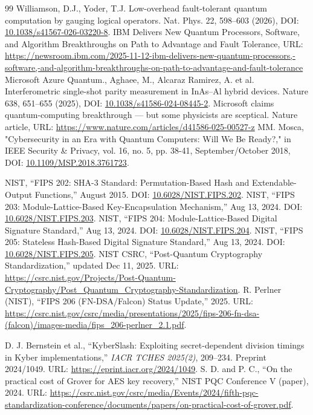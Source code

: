 \documentclass[11pt,a4paper]{article}
\begin{document}
\begin{thebibliography}{99}
 Williamson, D.J., Yoder, T.J. Low-overhead fault-tolerant quantum computation by gauging logical operators. Nat. Phys. 22, 598–603 (2026), DOI: \href{https://doi.org/10.1038/s41567-026-03220-8}{10.1038/s41567-026-03220-8}.
 IBM Delivers New Quantum Processors, Software, and Algorithm Breakthroughs on Path to Advantage and Fault Tolerance, URL: \url{https://newsroom.ibm.com/2025-11-12-ibm-delivers-new-quantum-processors,-software,-and-algorithm-breakthroughs-on-path-to-advantage-and-fault-tolerance}
 Microsoft Azure Quantum., Aghaee, M., Alcaraz Ramirez, A. et al. Interferometric single-shot parity measurement in InAs–Al hybrid devices. Nature 638, 651–655 (2025), DOI: \href{https://doi.org/10.1038/s41586-024-08445-2}{10.1038/s41586-024-08445-2}.
 Microsoft claims quantum-computing breakthrough — but some physicists are sceptical. Nature article, URL: \url{https://www.nature.com/articles/d41586-025-00527-z}
 MM. Mosca, "Cybersecurity in an Era with Quantum Computers: Will We Be Ready?," in IEEE Security \& Privacy, vol. 16, no. 5, pp. 38-41, September/October 2018, DOI: \href{https://doi.org/10.1109/MSP.2018.3761723}{10.1109/MSP.2018.3761723}.

 NIST, ``FIPS 202: SHA-3 Standard: Permutation-Based Hash and Extendable-Output Functions,'' August 2015. DOI: \href{https://doi.org/10.6028/NIST.FIPS.202}{10.6028/NIST.FIPS.202}.
 NIST, ``FIPS 203: Module-Lattice-Based Key-Encapsulation Mechanism,'' Aug 13, 2024. DOI: \href{https://doi.org/10.6028/NIST.FIPS.203}{10.6028/NIST.FIPS.203}.
 NIST, ``FIPS 204: Module-Lattice-Based Digital Signature Standard,'' Aug 13, 2024. DOI: \href{https://doi.org/10.6028/NIST.FIPS.204}{10.6028/NIST.FIPS.204}.
 NIST, ``FIPS 205: Stateless Hash-Based Digital Signature Standard,'' Aug 13, 2024. DOI: \href{https://doi.org/10.6028/NIST.FIPS.205}{10.6028/NIST.FIPS.205}.
 NIST CSRC, ``Post-Quantum Cryptography Standardization,'' updated Dec 11, 2025. URL: \url{https://csrc.nist.gov/Projects/Post-Quantum-Cryptography/Post_Quantum_Cryptography-Standardization}.
 R. Perlner (NIST), ``FIPS 206 (FN-DSA/Falcon) Status Update,'' 2025. URL: \url{https://csrc.nist.gov/csrc/media/presentations/2025/fips-206-fn-dsa-(falcon)/images-media/fips_206-perlner_2.1.pdf}.

 D. J. Bernstein et al., ``KyberSlash: Exploiting secret-dependent division timings in Kyber implementations,'' \emph{IACR TCHES 2025(2)}, 209--234. Preprint 2024/1049. URL: \url{https://eprint.iacr.org/2024/1049}.
 S. D. and P. C., ``On the practical cost of Grover for AES key recovery,'' NIST PQC Conference V (paper), 2024. URL: \url{https://csrc.nist.gov/csrc/media/Events/2024/fifth-pqc-standardization-conference/documents/papers/on-practical-cost-of-grover.pdf}.


\end{thebibliography}
\end{document}
